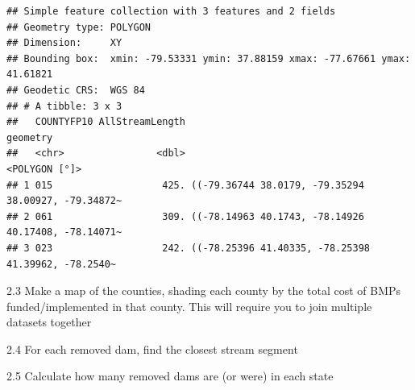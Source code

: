 \documentclass[
]{article}
\begin{document}
\begin{verbatim}
## Simple feature collection with 3 features and 2 fields
## Geometry type: POLYGON
## Dimension:     XY
## Bounding box:  xmin: -79.53331 ymin: 37.88159 xmax: -77.67661 ymax: 41.61821
## Geodetic CRS:  WGS 84
## # A tibble: 3 x 3
##   COUNTYFP10 AllStreamLength                                            geometry
##   <chr>                <dbl>                                       <POLYGON [°]>
## 1 015                   425. ((-79.36744 38.0179, -79.35294 38.00927, -79.34872~
## 2 061                   309. ((-78.14963 40.1743, -78.14926 40.17408, -78.14071~
## 3 023                   242. ((-78.25396 41.40335, -78.25398 41.39962, -78.2540~
\end{verbatim}

2.3 Make a map of the counties, shading each county by the total cost of
BMPs funded/implemented in that county. This will require you to join
multiple datasets together

2.4 For each removed dam, find the closest stream segment

2.5 Calculate how many removed dams are (or were) in each state
\end{document}
